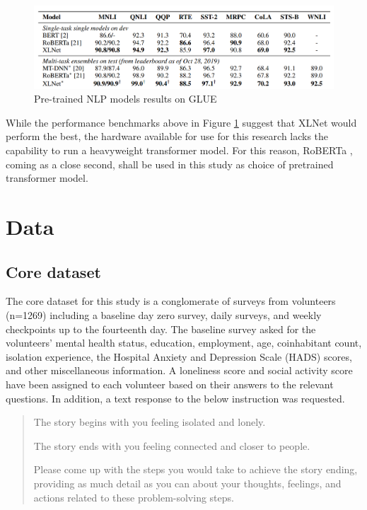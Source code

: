 \documentclass[12pt, a4paper]{article}
\begin{document}
\begin{figure}
	\includegraphics[scale=0.45]{benchmarks}
	\caption{Pre-trained NLP models results on GLUE}
	\label{benchmarks}
\end{figure}

While the performance benchmarks above in Figure \ref{benchmarks} suggest that XLNet would perform the best, the hardware available for use for this research lacks the capability to run a heavyweight transformer model. For this reason, RoBERTa \cite{roberta}, coming as a close second, shall be used in this study as choice of pretrained transformer model.

\section{Data}

\subsection{Core dataset}
The core dataset for this study is a conglomerate of surveys from volunteers (n=1269) including a baseline day zero survey, daily surveys, and weekly checkpoints up to the fourteenth day. The baseline survey asked for the volunteers' mental health status, education, employment, age, coinhabitant count, isolation experience, the Hospital Anxiety and Depression Scale (HADS) scores, and other miscellaneous information. A loneliness score and social activity score have been assigned to each volunteer based on their answers to the relevant questions. In addition, a text response to the below instruction was requested. 

\begin{quote}
The story begins with you feeling isolated and lonely.

The story ends with you feeling connected and closer to people.

Please come up with the steps you would take to achieve the story ending, providing as much detail as you can about your thoughts, feelings, and actions related to these problem-solving steps.
\end{quote}
\end{document}
